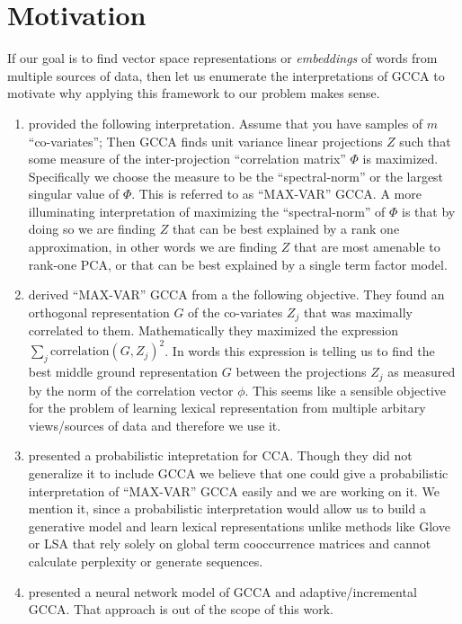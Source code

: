 \section{Motivation}
\label{sec:motivation}

If our goal is to find vector space representations or
\emph{embeddings} of words from multiple sources of data, then let us
enumerate the interpretations of GCCA to motivate why applying this
framework to our problem makes sense.

\begin{enumerate}[leftmargin=*]
\item \cite{horst1961generalized} provided the following
  interpretation. Assume that you have samples of $m$
  ``co-variates''; Then GCCA finds unit variance linear
  projections $Z$ such that some measure of the inter-projection ``correlation
  matrix'' $\Phi$ is maximized. Specifically we choose the measure to be
  the ``spectral-norm'' or the largest singular value of $\Phi$. This
  is referred to as ``MAX-VAR'' GCCA. A more illuminating
  interpretation of maximizing the ``spectral-norm'' of $\Phi$ is that
  by doing so we are finding $Z$ that can be best explained by a rank
  one approximation, in other words we are finding $Z$ that are most
  amenable to rank-one PCA, or that can be best explained by a single
  term factor model.
\item \cite{carroll1968generalization} derived ``MAX-VAR'' GCCA from a
  the following objective. They found an orthogonal
  representation $G$ of the co-variates $Z_j$ that was maximally
  correlated to them. Mathematically they maximized
   the expression $\sum_j \textrm{correlation}(G, Z_j)^2$. In words
   this expression is telling us to find the best middle ground
   representation $G$ between the projections $Z_j$ as measured by the
   norm of the correlation vector $\phi$. This seems like a sensible
   objective for the problem of learning lexical representation from
   multiple arbitary views/sources of data and therefore
   we use it.
\item \cite{bach2005probabilistic} presented a probabilistic
  intepretation for CCA. Though they did not generalize it to
  include GCCA we believe that one could give a probabilistic
  interpretation of ``MAX-VAR'' GCCA easily and we are working on
  it. We mention it, since a probabilistic
  interpretation would allow us to build a generative model and learn
  lexical representations unlike methods like Glove or LSA that rely
  solely on global term cooccurrence matrices and cannot calculate
  perplexity or generate sequences.
\item \cite{via2007learning} presented a neural network model of GCCA and
  adaptive/incremental GCCA. That approach is out of the scope of this work.
\end{enumerate}

